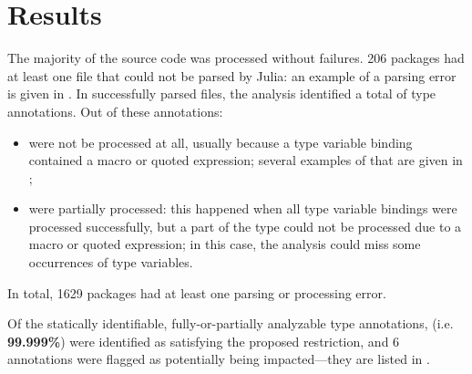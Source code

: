 \section{Results}\label{sec:eval:results}

The majority of the source code was processed without failures.
206 packages had at least one file that could not be parsed by Julia:
an example of a parsing error is given in .
In successfully parsed files, the analysis identified a total of
 type annotations.
Out of these annotations:
\begin{itemize}
  \item {} were not be processed at all, usually because 
    a type variable binding contained a macro or quoted expression;
    several examples of that are given
    in ;
  \item {} were partially processed: this happened when all 
    type variable bindings were processed successfully, but a part of the type
    could not be processed due to a macro or quoted expression; in this case, 
    the analysis could miss some occurrences of type variables.
\end{itemize}
In total, 1629 packages had at least one %
parsing or processing error.

Of the  statically identifiable, 
fully-or-partially analyzable type annotations,
 (i.e. \textbf{99.999\%}) were identified as satisfying
the proposed restriction,
and 6 annotations were flagged as potentially being impacted---they are listed
in .

